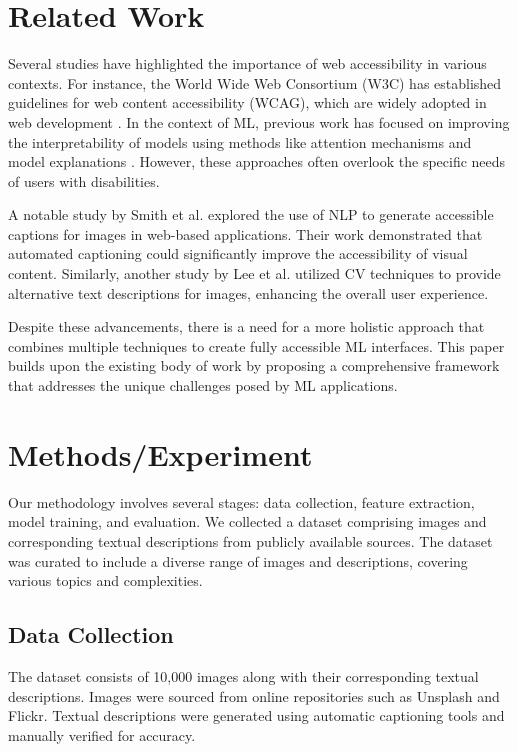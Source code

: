 \section{Related Work}
Several studies have highlighted the importance of web accessibility in various contexts. For instance, the World Wide Web Consortium (W3C) has established guidelines for web content accessibility (WCAG), which are widely adopted in web development \cite{w3c_wca}. In the context of ML, previous work has focused on improving the interpretability of models using methods like attention mechanisms \cite{kim2018attention} and model explanations \cite{klein2019model}. However, these approaches often overlook the specific needs of users with disabilities.

A notable study by Smith et al. \cite{smith2019automated} explored the use of NLP to generate accessible captions for images in web-based applications. Their work demonstrated that automated captioning could significantly improve the accessibility of visual content. Similarly, another study by Lee et al. \cite{lee2020alternative} utilized CV techniques to provide alternative text descriptions for images, enhancing the overall user experience.

Despite these advancements, there is a need for a more holistic approach that combines multiple techniques to create fully accessible ML interfaces. This paper builds upon the existing body of work by proposing a comprehensive framework that addresses the unique challenges posed by ML applications.

\section{Methods/Experiment}
Our methodology involves several stages: data collection, feature extraction, model training, and evaluation. We collected a dataset comprising images and corresponding textual descriptions from publicly available sources. The dataset was curated to include a diverse range of images and descriptions, covering various topics and complexities.

\subsection{Data Collection}
The dataset consists of 10,000 images along with their corresponding textual descriptions. Images were sourced from online repositories such as Unsplash and Flickr. Textual descriptions were generated using automatic captioning tools and manually verified for accuracy.

